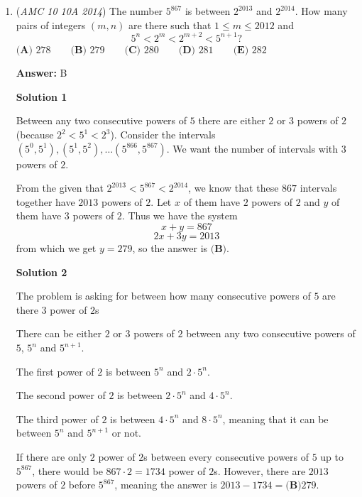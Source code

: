 \begin{enumerate}
 This means that the group number $k$ of the $500,000$th element is $1000-3=997$ (by looking at the pattern from our list).

 Notice that the group number of every group is how many numbers will be skipped after the numbers from that group appear. This means that the numbers from $1$ to $996$ are skipped.

 It follows that our answer is thus $\frac{996(997)}{2} + 500,000 = 996506$, yielding $\boxed{A}$



	\item (\textit{AMC 10 10A 2014}) The number $5^{867}$ is between $2^{2013}$ and $2^{2014}$.  How many pairs of integers $(m,n)$ are there such that $1\leq m\leq 2012$ and 
 \[5^n<2^m<2^{m+2}<5^{n+1}?\]
$\textbf{(A) }278\qquad\textbf{(B) }279\qquad\textbf{(C) }280\qquad\textbf{(D) }281\qquad\textbf{(E) }282\qquad$

 \textbf{Answer: }B



\textbf{Solution 1}

Between any two consecutive powers of $5$ there are either $2$ or $3$ powers of $2$ (because $2^2<5^1<2^3$). Consider the intervals $(5^0,5^1),(5^1,5^2),\dots (5^{866},5^{867})$. We want the number of intervals with $3$ powers of $2$.

 From the given that $2^{2013}<5^{867}<2^{2014}$, we know that these $867$ intervals together have $2013$ powers of $2$. Let $x$ of them have $2$ powers of $2$ and $y$ of them have $3$ powers of $2$. Thus we have the system
 \[x+y=867\]
 \[2x+3y=2013\]from which we get $y=279$, so the answer is $\boxed{\textbf{(B)}}$.

 



\textbf{Solution 2}

The problem is asking for between how many consecutive powers of $5$ are there $3$ power of $2$s

 There can be either $2$ or $3$ powers of $2$ between any two consecutive powers of $5$, $5^n$ and $5^{n+1}$. 

 The first power of $2$ is between $5^n$ and $2 \cdot 5^n$.

 The second power of $2$ is between $2 \cdot 5^n$ and $4 \cdot 5^n$.

 The third power of $2$ is between $4 \cdot 5^n$ and $8 \cdot 5^n$, meaning that it can be between $5^n$ and $5^{n+1}$ or not.

 If there are only $2$ power of $2$s between every consecutive powers of $5$ up to $5^{867}$, there would be $867\cdot 2 = 1734$ power of $2$s. However, there are $2013$ powers of $2$ before  $5^{867}$, meaning the answer is $2013 - 1734 = \boxed{\textbf{(B)}279}$.

 


\end{enumerate}